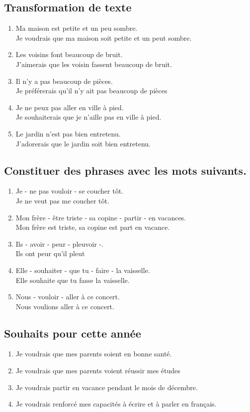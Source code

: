 \documentclass[12pt]{article}
\begin{document}
\subsection{Transformation de texte}
\begin{enumerate}
	\item Ma maison est petite et un peu sombre.\\
	       Je voudrais que ma maison soit petite et un peut sombre.
	\item Les voisins font beaucoup de bruit.\\
	       J’aimerais que les voisin fassent beaucoup de bruit.
	\item Il n’y a pas beaucoup de pièces.\\
	        Je préférerais qu'il n'y ait pas beaucoup de pièces
	\item Je ne peux pas aller en ville à pied.\\
	        Je souhaiterais que je n'aille pas en ville à pied.
	\item Le jardin n’est pas bien entretenu.\\
	        J’adorerais que le jardin soit bien entretenu.
\end{enumerate}
\subsection{Constituer des phrases avec les mots suivants.}
\begin{enumerate}
	\item Je - ne pas vouloir - se coucher tôt.\\
	       Je ne veut pas me coucher tôt.
	\item Mon frère - être triste - sa copine - partir - en vacances.\\
	       Mon frère est triste, sa copine est part en vacance.
	\item Ils - avoir - peur - pleuvoir -.\\
	       Ils ont peur qu'il pleut
	\item Elle - souhaiter - que tu - faire - la vaisselle.\\
	       Elle souhaite que tu fasse la vaisselle.
	\item Nous - vouloir - aller à ce concert.\\
	       Nous voulions aller à ce concert.
\end{enumerate}
\subsection{Souhaits pour cette année}
\begin{enumerate}
	\item Je voudrais que mes parents soient en bonne santé.
	\item Je voudrais que mes parents voient réussir mes études
	\item Je voudrais partir en vacance pendant le mois de décembre.
	\item Je voudrais renforcé mes capacités à écrire et à parler en français.
\end{enumerate}
\end{document}
